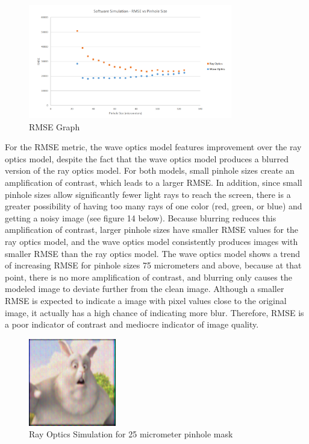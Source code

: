 \documentclass{acmsiggraph}
\begin{document}
\begin{figure}[ht]
  \centering
  \includegraphics[width=3.5in]{RMSE.png}
  \caption{RMSE Graph}
  \label{fig:ferrari}
\end{figure}

For the RMSE metric, the wave optics model features improvement over the ray optics model, despite the fact that the wave optics model produces a blurred version of the ray optics model. For both models, small pinhole sizes create an amplification of contrast, which leads to a larger RMSE. In addition, since small pinhole sizes allow significantly fewer light rays to reach the screen, there is a greater possibility of having too many rays of one color (red, green, or blue) and getting a noisy image (see figure 14 below). Because blurring reduces this amplification of contrast, larger pinhole sizes have smaller RMSE values for the ray optics model, and the wave optics model consistently produces images with smaller RMSE than the ray optics model. The wave optics model shows a trend of increasing RMSE for pinhole sizes 75 micrometers and above, because at that point, there is no more amplification of contrast, and blurring only causes the modeled image to deviate further from the clean image. Although a smaller RMSE is expected to indicate a image with pixel values close to the original image, it actually has a high chance of indicating more blur. Therefore, RMSE is a poor indicator of contrast and mediocre indicator of image quality. 

\begin{figure}[ht]
  \centering
  \includegraphics[width=1.5in]{simulationResult_25.png}
  \caption{Ray Optics Simulation for 25 micrometer pinhole mask}
  \label{fig:ferrari}
\end{figure}
\end{document}
